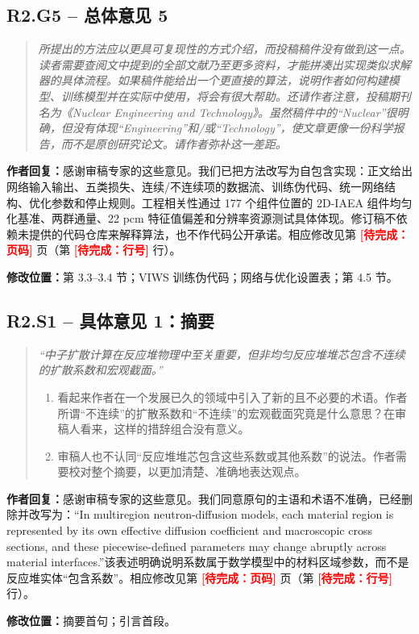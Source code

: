 \documentclass[11pt,a4paper]{article}
\newenvironment{reviewercomment}{\begin{quote}\small\itshape\color{commentgray}}{\end{quote}}
\newcommand{\authorresponse}{\noindent\textbf{作者回复：}\quad}
\newcommand{\revisionlocation}[1]{\par\noindent\textcolor{locationblue}{\textbf{修改位置：}}#1}
\newcommand{\draftplaceholder}[1]{\textcolor{red}{\textbf{[待完成：#1]}}}
\begin{document}
\subsection*{R2.G5 -- 总体意见 5}
\begin{reviewercomment}
所提出的方法应以更具可复现性的方式介绍，而投稿稿件没有做到这一点。读者需要查阅文中提到的全部文献乃至更多资料，才能拼凑出实现类似求解器的具体流程。如果稿件能给出一个更直接的算法，说明作者如何构建模型、训练模型并在实际中使用，将会有很大帮助。还请作者注意，投稿期刊名为《Nuclear Engineering and Technology》。虽然稿件中的“Nuclear”很明确，但没有体现“Engineering”和/或“Technology”，使文章更像一份科学报告，而不是原创研究论文。请作者弥补这一差距。
\end{reviewercomment}
\authorresponse 感谢审稿专家的这些意见。我们已把方法改写为自包含实现：正文给出网络输入输出、五类损失、连续/不连续项的数据流、训练伪代码、统一网络结构、优化参数和停止规则。工程相关性通过 177 个组件位置的 2D-IAEA 组件均匀化基准、两群通量、22 pcm 特征值偏差和分辨率资源测试具体体现。修订稿不依赖未提供的代码仓库来解释算法，也不作代码公开承诺。相应修改见第 \draftplaceholder{页码} 页（第 \draftplaceholder{行号} 行）。
\revisionlocation{第 3.3--3.4 节；VIWS 训练伪代码；网络与优化设置表；第 4.5 节。}

\subsection*{R2.S1 -- 具体意见 1：摘要}
\begin{reviewercomment}
“中子扩散计算在反应堆物理中至关重要，但非均匀反应堆堆芯包含不连续的扩散系数和宏观截面。”

\begin{enumerate}[label=\alph*.,leftmargin=2em]
\item 看起来作者在一个发展已久的领域中引入了新的且不必要的术语。作者所谓“不连续”的扩散系数和“不连续”的宏观截面究竟是什么意思？在审稿人看来，这样的措辞组合没有意义。
\item 审稿人也不认同“反应堆堆芯包含这些系数或其他系数”的说法。作者需要校对整个摘要，以更加清楚、准确地表达观点。
\end{enumerate}
\end{reviewercomment}
\authorresponse 感谢审稿专家的这些意见。我们同意原句的主语和术语不准确，已经删除并改写为：“In multiregion neutron-diffusion models, each material region is represented by its own effective diffusion coefficient and macroscopic cross sections, and these piecewise-defined parameters may change abruptly across material interfaces.”该表述明确说明系数属于数学模型中的材料区域参数，而不是反应堆实体“包含系数”。相应修改见第 \draftplaceholder{页码} 页（第 \draftplaceholder{行号} 行）。
\revisionlocation{摘要首句；引言首段。}
\end{document}

